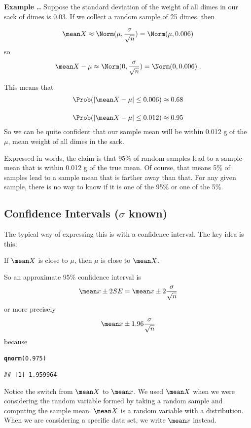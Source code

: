 \documentclass[twoside]{book}\usepackage[]{graphicx}\usepackage[]{xcolor}
\makeatletter
\newcommand{\hlnum}[1]{\textcolor[rgb]{0.686,0.059,0.569}{#1}}%
\newcommand{\hlstd}[1]{\textcolor[rgb]{0.345,0.345,0.345}{#1}}%
\newcommand{\hlkwd}[1]{\textcolor[rgb]{0.737,0.353,0.396}{\textbf{#1}}}%
\newenvironment{kframe}{%
 \def\at@end@of@kframe{}%
 \ifinner\ifhmode%
  \def\at@end@of@kframe{\end{minipage}}%
  \begin{minipage}{\columnwidth}%
 \fi\fi%
 \def\FrameCommand##1{\hskip\@totalleftmargin \hskip-\fboxsep
 \colorbox{shadecolor}{##1}\hskip-\fboxsep
     \hskip-\linewidth \hskip-\@totalleftmargin \hskip\columnwidth}%
 \MakeFramed {\advance\hsize-\width
   \@totalleftmargin\z@ \linewidth\hsize
   \@setminipage}}%
 {\par\unskip\endMakeFramed%
 \at@end@of@kframe}
\newenvironment{knitrout}{}{} %
\newcounter{example}[section]
\newenvironment{example}%
{\refstepcounter{example}%
\textbf{Example \thesection.\arabic{example}. }}%
{}
\makeatother
\begin{document}
\begin{example}
	Suppose the standard deviation of the weight of all dimes in our sack of dimes is $0.03$.
	If we collect a random sample of 25 dimes, then 

	\[
	\mean X \approx \Norm( \mu, \frac{\sigma}{\sqrt{n}}) = \Norm(\mu, 0.006)
	\]
	so 
	\[
	\mean X - \mu  \approx \Norm( 0, \frac{\sigma}{\sqrt{n}}) = \Norm(0, 0.006) \;.
	\]

	This means that
	\begin{align*}
	\Prob( | \mean X - \mu | \le 0.006 ) &\approx 0.68
	\\[4mm]
	\Prob( | \mean X - \mu | \le 0.012 ) &\approx 0.95
\end{align*}
So we can be quite confident that our sample mean will be within 0.012 g of the $\mu$,
mean weight of all dimes in the sack.

Expressed in words, the claim is that 95\% of random samples lead to a sample mean
that is within 0.012 g of the true mean.  Of course, that means 5\% of samples lead
to a sample mean that is farther away than that.  For any given sample, there is 
no way to know if it is one of the 95\% or one of the 5\%.
\end{example}


\subsection{Confidence Intervals ($\sigma$ known)}

The typical way of expressing this is with a confidence interval.  The key idea 
is this:

\begin{center}
If $\mean X$ is close to $\mu$, then $\mu$ is close to $\mean X$.
\end{center}

So an approximate 95\% confidence interval is 
\[
\mean x \pm 2 SE 
= \mean x \pm 2 \frac{\sigma}{\sqrt{n}}
\]
or more precisely
\[
\mean x \pm 1.96 \frac{\sigma}{\sqrt{n}}
\]
because
\begin{knitrout}
\color{fgcolor}\begin{kframe}
\begin{alltt}
\hlkwd{qnorm}\hlstd{(}\hlnum{0.975}\hlstd{)}
\end{alltt}
\begin{verbatim}
## [1] 1.959964
\end{verbatim}
\end{kframe}
\end{knitrout}
Notice the switch from $\mean X$ to $\mean x$.  We used $\mean X$ when we were
considering the random variable formed by taking a random sample and computing
the sample mean.  $\mean X$ is a random variable with a distribution.
When we are considering a specific data set, we write $\mean x$ instead.
\end{document}
